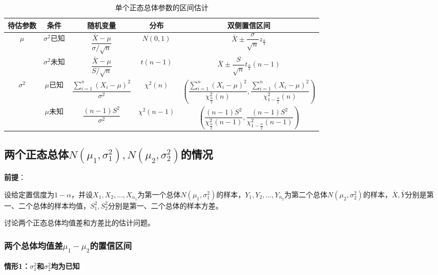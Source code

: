 \documentclass[11pt,a4paper]{report}
\theoremstyle{definition}
\begin{document}
\begin{table}[htbp]
\centering
\caption{单个正态总体参数的区间估计}
\begin{tabular}{@{}ccccc@{}}
\toprule
\textbf{待估参数} & \textbf{条件} & \textbf{随机变量} & \textbf{分布} & \textbf{双侧置信区间} \\
\midrule
\multirow{2}{*}{$\mu$} & $\sigma^{2}$已知 & $\dfrac{\bar{X}-\mu}{\sigma/\sqrt{n}}$ & $N(0,1)$ & $\bar{X}\pm\dfrac{\sigma}{\sqrt{n}}z_{\frac{\alpha}{2}}$ \\
\cmidrule{2-5}
 & $\sigma^{2}$未知 & $\dfrac{\bar{X}-\mu}{S/\sqrt{n}}$ & $t(n-1)$ & $\bar{X}\pm\dfrac{S}{\sqrt{n}}t_{\frac{\alpha}{2}}(n-1)$ \\
\midrule
\multirow{2}{*}{$\sigma^{2}$} & $\mu$已知 & $\dfrac{\sum_{i=1}^{n}(X_{i}-\mu)^{2}}{\sigma^{2}}$ & $\chi^{2}(n)$ & $\left(\dfrac{\sum_{i=1}^{n}(X_{i}-\mu)^{2}}{\chi_{\frac{\alpha}{2}}^{2}(n)},\dfrac{\sum_{i=1}^{n}(X_{i}-\mu)^{2}}{\chi_{1-\frac{\alpha}{2}}^{2}(n)}\right)$ \\
\cmidrule{2-5}
 & $\mu$未知 & $\dfrac{(n-1)S^{2}}{\sigma^{2}}$ & $\chi^{2}(n-1)$ & $\left(\dfrac{(n-1)S^{2}}{\chi_{\frac{\alpha}{2}}^{2}(n-1)},\dfrac{(n-1)S^{2}}{\chi_{1-\frac{\alpha}{2}}^{2}(n-1)}\right)$ \\
\bottomrule
\end{tabular}
\end{table}

\subsection{两个正态总体\texorpdfstring{$N(\mu_{1},\sigma_{1}^{2}),N(\mu_{2},\sigma_{2}^{2})$}{N(mu1,sigma12),N(mu2,sigma22)}的情况}

\textbf{前提}：

设给定置信度为$1-\alpha$，并设$X_{1},X_{2},\ldots,X_{n_{1}}$为第一个总体$N(\mu_{1},\sigma_{1}^{2})$的样本，$Y_{1},Y_{2},\ldots,Y_{n_{2}}$为第二个总体$N(\mu_{2},\sigma_{2}^{2})$的样本，$\bar{X},\bar{Y}$分别是第一、二个总体的样本均值，$S_{1}^{2},S_{2}^{2}$分别是第一、二个总体的样本方差。

讨论两个正态总体均值差和方差比的估计问题。

\subsubsection{两个总体均值差\texorpdfstring{$\mu_{1}-\mu_{2}$}{mu1-mu2}的置信区间}

\textbf{情形1：$\sigma_{1}^{2}$和$\sigma_{2}^{2}$均为已知}
\end{document}
